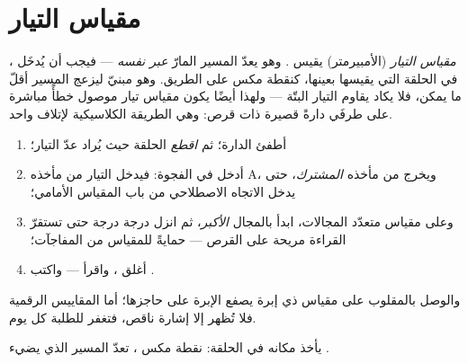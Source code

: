 \section{مقياس التيار}

\begin{definition}\label{def:g8:intensity-ammeter:ammeter}
\emph{مقياس التيار} (الأمبيرمتر) يقيس
. وهو يعدّ المسير المارّ \emph{عبر نفسه} --- فيجب أن
يُدخَل \emph{}، في الحلقة التي يقيسها بعينها، كنقطة
مكس على الطريق. وهو مبنيّ ليزعج المسير أقلّ ما يمكن، فلا يكاد
يقاوم التيار البتّة --- ولهذا أيضًا يكون مقياس تيار موصول خطأً
مباشرة على طرفَي  دارةً قصيرة ذات قرص: وهي الطريقة
الكلاسيكية لإتلاف واحد.
\end{definition}

\begin{method}[قياس شدّة]\label{met:g8:intensity-ammeter:measure}
\begin{enumerate}
  \item أطفئ الدارة؛ ثم \emph{اقطع} الحلقة حيث يُراد عدّ
        التيار؛
  \item أدخل  في الفجوة: فيدخل التيار من مأخذه
        \unit{A}، ويخرج من مأخذه \emph{المشترك}، حتى يدخل
        الاتجاه الاصطلاحي من باب المقياس الأمامي؛
  \item وعلى مقياس متعدّد المجالات، ابدأ بالمجال \emph{الأكبر}،
        ثم انزل درجة درجة حتى تستقرّ القراءة مريحة على القرص
        --- حمايةً للمقياس من المفاجآت؛
  \item أغلق ، واقرأ --- واكتب .
\end{enumerate}
والوصل بالمقلوب على مقياس ذي إبرة يصفع الإبرة على حاجزها؛ أما
المقاييس الرقمية فلا تُظهر إلا إشارة ناقص، فتغفر للطلبة كل
يوم.
\end{method}

\begin{omfigure}

{\small {} يأخذ مكانه في الحلقة: نقطة مكس ، تعدّ المسير الذي يضيء .}
\end{omfigure}

